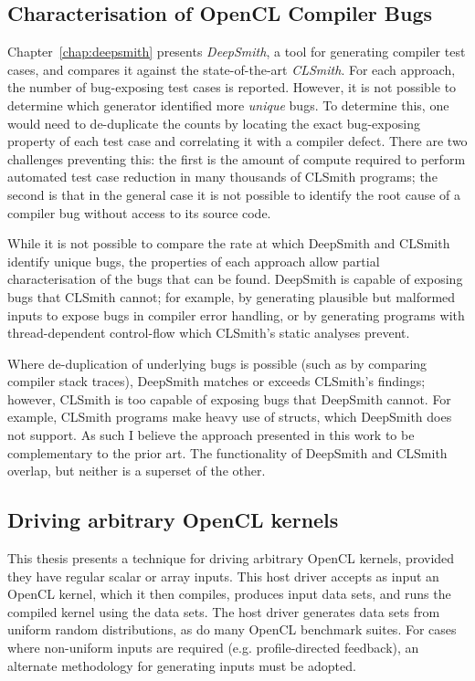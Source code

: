 \subsection{Characterisation of OpenCL Compiler Bugs}

Chapter~\ref{chap:deepsmith} presents \emph{DeepSmith}, a tool for generating compiler test cases, and compares it against the state-of-the-art \emph{CLSmith}. For each approach, the number of bug-exposing test cases is reported. However, it is not possible to determine which generator identified more \emph{unique} bugs. To determine this, one would need to de-duplicate the counts by locating the exact bug-exposing property of each test case and correlating it with a compiler defect. There are two challenges preventing this: the first is the amount of compute required to perform automated test case reduction in many thousands of CLSmith programs; the second is that in the general case it is not possible to identify the root cause of a compiler bug without access to its source code.

While it is not possible to compare the rate at which DeepSmith and CLSmith identify unique bugs, the properties of each approach allow partial characterisation of the bugs that can be found. DeepSmith is capable of exposing bugs that CLSmith cannot; for example, by generating plausible but malformed inputs to expose bugs in compiler error handling, or by generating programs with thread-dependent control-flow which CLSmith's static analyses prevent.

Where de-duplication of underlying bugs is possible (such as by comparing compiler stack traces), DeepSmith matches or exceeds CLSmith's findings; however, CLSmith is too capable of exposing bugs that DeepSmith cannot. For example, CLSmith programs make heavy use of structs, which DeepSmith does not support. As such I believe the approach presented in this work to be complementary to the prior art. The functionality of DeepSmith and CLSmith overlap, but neither is a superset of the other.


\subsection{Driving arbitrary OpenCL kernels}

This thesis presents a technique for driving arbitrary OpenCL kernels, provided they have regular scalar or array inputs. This host driver accepts as input an OpenCL kernel, which it then compiles, produces input data sets, and runs the compiled kernel using the data sets. The host driver generates data sets from uniform random distributions, as do many OpenCL benchmark suites. For cases where non-uniform inputs are required (e.g. profile-directed feedback), an alternate methodology for generating inputs must be adopted.


